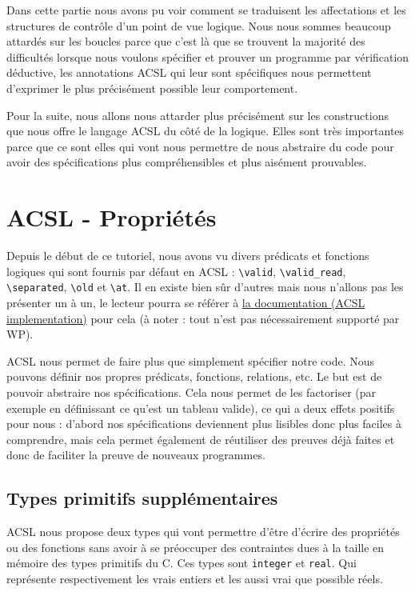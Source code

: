 \documentclass[12pt,francais,]{scrbook}
\begin{document}
Dans cette partie nous avons pu voir comment se traduisent les
affectations et les structures de contrôle d'un point de vue logique.
Nous nous sommes beaucoup attardés sur les boucles parce que c'est là
que se trouvent la majorité des difficultés lorsque nous voulons
spécifier et prouver un programme par vérification déductive, les
annotations ACSL qui leur sont spécifiques nous permettent d'exprimer le
plus précisément possible leur comportement.

Pour la suite, nous allons nous attarder plus précisément sur les
constructions que nous offre le langage ACSL du côté de la logique.
Elles sont très importantes parce que ce sont elles qui vont nous
permettre de nous abstraire du code pour avoir des spécifications plus
compréhensibles et plus aisément prouvables.

\chapter{ACSL - Propriétés}\label{acsl---propriuxe9tuxe9s}

Depuis le début de ce tutoriel, nous avons vu divers prédicats et
fonctions logiques qui sont fournis par défaut en ACSL :
\texttt{\textbackslash{}valid}, \texttt{\textbackslash{}valid\_read},
\texttt{\textbackslash{}separated}, \texttt{\textbackslash{}old} et
\texttt{\textbackslash{}at}. Il en existe bien sûr d'autres mais nous
n'allons pas les présenter un à un, le lecteur pourra se référer à
\href{http://frama-c.com/download.html}{la documentation (ACSL
implementation)} pour cela (à noter : tout n'est pas nécessairement
supporté par WP).

ACSL nous permet de faire plus que \og{}simplement\fg{} spécifier notre code.
Nous pouvons définir nos propres prédicats, fonctions, relations, etc.
Le but est de pouvoir abstraire nos spécifications. Cela nous permet de
les factoriser (par exemple en définissant ce qu'est un tableau valide),
ce qui a deux effets positifs pour nous : d'abord nos spécifications
deviennent plus lisibles donc plus faciles à comprendre, mais cela
permet également de réutiliser des preuves déjà faites et donc de
faciliter la preuve de nouveaux programmes.

\section{Types primitifs
supplémentaires}\label{types-primitifs-suppluxe9mentaires}

ACSL nous propose deux types qui vont permettre d'être d'écrire des
propriétés ou des fonctions sans avoir à se préoccuper des contraintes
dues à la taille en mémoire des types primitifs du C. Ces types sont
\texttt{integer} et \texttt{real}. Qui représente respectivement les
vrais entiers et les \og{}aussi vrai que possible\fg{} réels.
\end{document}
